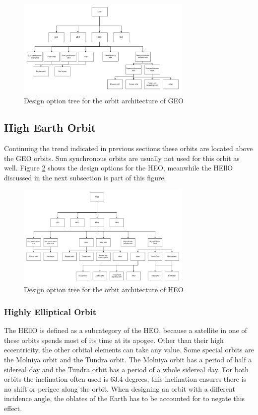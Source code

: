 \begin{figure}
\centering
  \includegraphics[width=0.75\textwidth,angle=0]{chapters/img/blDOOrb2.jpg}
	\caption{Design option tree for the orbit architecture of \ac{GEO}}
	\label{DOOrb2}
\end{figure}

\subsection{High Earth Orbit}
\label{sec:blOrb4}
Continuing the trend indicated in previous sections these orbits are located above the \acs{GEO} orbits. Sun synchronous orbits are usually not used for this orbit as well. 
Figure \ref{DOOrb3} shows the design options for the \ac{HEO}, meanwhile the \acs{HEllO} discussed in the next subsection is part of this figure.

\begin{figure}
\centering
  \includegraphics[width=0.75\textwidth,angle=0]{chapters/img/blDOOrb3.jpg}
	\caption{Design option tree for the orbit architecture of \ac{HEO}}
	\label{DOOrb3}
\end{figure}

\subsubsection{Highly Elliptical Orbit}
\label{sec:blOrb4.5}
The \ac{HEllO} is defined as a subcategory of the \acs{HEO}, because a satellite in one of these orbits spends most of its time at its apogee. Other than their high eccentricity, the other orbital elements can take any value. Some special orbits are the Molniya orbit and the Tundra orbit. The Molniya orbit has a period of half a sidereal day and the Tundra orbit has a period of a whole sidereal day. For both orbits the inclination often used is 63.4 degrees, this inclination ensures there is no shift or perigee along the orbit. When designing an orbit with a different incidence angle, the oblates of the Earth has to be accounted for to negate this effect.